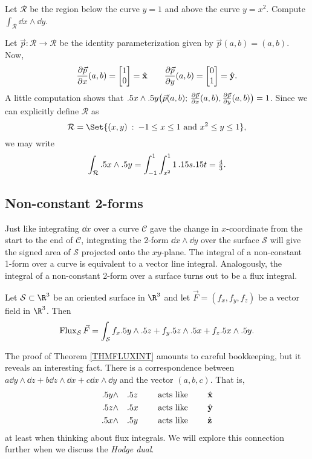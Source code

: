 \begin{example}
	Let $\mathcal R$ be the region below the curve $y=1$ and above the
	curve $y=x^2$.  Compute $\int_{\mathcal R} \dd x\wedge \dd y$.

	Let $\vec p:\mathcal R\to\mathcal R$ be the identity parameterization
	given by $\vec p(a,b)=(a,b)$.  Now,
	\[
	\frac{\partial \vec p}{\partial x} (a,b) = \mat{1\\ 0}=\xhat \qquad
	\frac{\partial \vec p}{\partial y} (a,b) = \mat{0\\ 1}=\yhat.
	\]
	A little computation shows that $.5 x\wedge .5 y\big(\vec p(a,b);\, 
	\tfrac{\partial \vec p}{\partial x} (a,b), \tfrac{\partial \vec p}{\partial y} (a,b)\big)
	= 1$.  Since we can explicitly define $\mathcal R$ as
	\[
		\mathcal R = \Set{(x,y)\given -1\leq x\leq 1\text{ and }x^2\leq y\leq 1},
	\]
	we may write
	\[
		\int_{\mathcal R} .5 x\wedge .5 y = \int_{-1}^1 \int_{x^2}^1
		1\,.15 s.15 t = \tfrac{4}{3}.
	\]
\end{example}

\subsection{Non-constant 2-forms}

Just like integrating $\dd x$ over a curve $\mathcal C$
gave the change in $x$-coordinate from the start to the end of $\mathcal C$,
integrating the 2-form $\dd x\wedge \dd y$ over the surface $\mathcal S$ will
give the signed area of $\mathcal S$ projected onto the $xy$-plane.
The integral of a non-constant 1-form over a curve
is equivalent to a vector line integral.  Analogously, the integral
of a non-constant 2-form over a surface turns out
to be a flux integral.

\begin{theorem}
	\label{THMFLUXINT}
	Let $\mathcal S\subset \R^3$ be an oriented surface in $\R^3$ and
	let $\vec F=(f_x,f_y,f_z)$ be a vector field in $\R^3$.  Then
	\[
		\operatorname{Flux}_{\mathcal S} \vec F
		=\int_{\mathcal S} f_x.5 y\wedge .5 z+f_y .5 z\wedge .5 x
		+f_z .5 x\wedge .5 y.
	\]
\end{theorem}

The proof of Theorem \ref{THMFLUXINT} amounts to careful bookkeeping, but it
reveals an interesting fact.  There is a correspondence between
$a \dd y\wedge \dd z+b\dd z\wedge \dd x+c\dd x\wedge \dd y$
and the vector $(a,b,c)$.  That is,
\begin{alignat*}{4}
	.5 y&\wedge &&.5 z\quad&&\text{ acts like } \quad&&{\hat {\mathbf x}} \\
	.5 z&\wedge &&.5 x\quad&&\text{ acts like } \quad&&{\hat {\mathbf y}} \\
	.5 x&\wedge &&.5 y\quad&&\text{ acts like } \quad&&{\hat {\mathbf z}} 
\end{alignat*}
at least when thinking about flux integrals.  We will explore this
connection further when we discuss the \emph{Hodge dual}.

